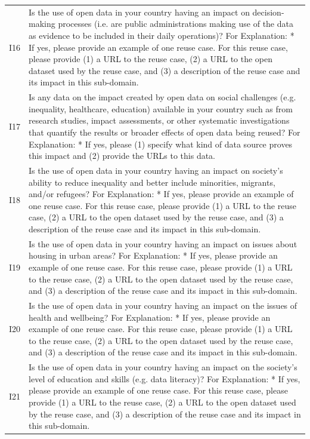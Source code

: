 {\begin{longtable}[]{@{}
  L{0.1386}
  L{0.8614}@{}}
I16 & Is the use of open data in your country having an impact on decision-making processes (i.e. are public administrations making use of the data as evidence to be included in their daily operations)? For Explanation: * If yes, please provide an example of one reuse case. For this reuse case, please provide (1) a URL to the reuse case, (2) a URL to the open dataset used by the reuse case, and (3) a description of the reuse case and its impact in this sub-domain. \\
I17 & Is any data on the impact created by open data on social challenges (e.g. inequality, healthcare, education) available in your country such as from research studies, impact assessments, or other systematic investigations that quantify the results or broader effects of open data being reused? For Explanation: * If yes, please (1) specify what kind of data source proves this impact and (2) provide the URLs to this data. \\
I18 & Is the use of open data in your country having an impact on society's ability to reduce inequality and better include minorities, migrants, and/or refugees? For Explanation: * If yes, please provide an example of one reuse case. For this reuse case, please provide (1) a URL to the reuse case, (2) a URL to the open dataset used by the reuse case, and (3) a description of the reuse case and its impact in this sub-domain. \\
I19 & Is the use of open data in your country having an impact on issues about housing in urban areas? For Explanation: * If yes, please provide an example of one reuse case. For this reuse case, please provide (1) a URL to the reuse case, (2) a URL to the open dataset used by the reuse case, and (3) a description of the reuse case and its impact in this sub-domain. \\
I20 & Is the use of open data in your country having an impact on the issues of health and wellbeing? For Explanation: * If yes, please provide an example of one reuse case. For this reuse case, please provide (1) a URL to the reuse case, (2) a URL to the open dataset used by the reuse case, and (3) a description of the reuse case and its impact in this sub-domain. \\
I21 & Is the use of open data in your country having an impact on the society's level of education and skills (e.g. data literacy)? For Explanation: * If yes, please provide an example of one reuse case. For this reuse case, please provide (1) a URL to the reuse case, (2) a URL to the open dataset used by the reuse case, and (3) a description of the reuse case and its impact in this sub-domain. \\

\end{longtable}}
